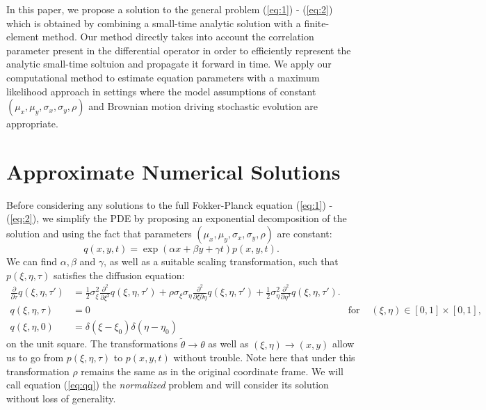 \documentclass[10pt]{article}
\begin{document}
In this paper, we propose a solution to the general problem
(\ref{eq:1}) - (\ref{eq:2}) which is obtained by combining a
small-time analytic solution with a finite-element method. Our method
directly takes into account the correlation parameter present in the
differential operator in order to efficiently represent the analytic
small-time soltuion and propagate it forward in time. We apply our
computational method to estimate equation parameters with a maximum
likelihood approach in settings where the model assumptions of
constant $(\mu_x, \mu_y, \sigma_x, \sigma_y, \rho)$ and Brownian
motion driving stochastic evolution are appropriate.


\section{Approximate Numerical Solutions}
Before considering any solutions to the full Fokker-Planck equation
(\ref{eq:1}) - (\ref{eq:2}), we simplify the PDE by proposing an
exponential decomposition of the solution and using the fact that parameters
$(\mu_x, \mu_y, \sigma_x, \sigma_y, \rho)$ are constant:
\[
  q(x,y,t) = \exp(\alpha x + \beta y + \gamma t) p(x,y,t).
\]
We can find $\alpha, \beta$ and $\gamma$, as well as a suitable
scaling transformation, such that $p(\xi,\eta,\tau)$ satisfies the diffusion
equation:
\begin{align}
  \frac{\partial}{\partial \tau} q(\xi,\eta,\tau') &= \frac{1}{2}\sigma_\xi^2
  \frac{\partial^2}{\partial \xi^2}q(\xi,\eta,\tau') + \rho\sigma_\xi\sigma_\eta
  \frac{\partial^2}{\partial \xi \partial \eta}q(\xi,\eta,\tau') +
  \frac{1}{2}\sigma_\eta^2 \frac{\partial^2}{\partial \eta^2}q(\xi,\eta,\tau').
                                          \label{eq:qq} \\
  q(\xi,\eta,\tau) &=0 &\mbox{for } & (\xi,\eta) \in [0,1] \times [0,1], \nonumber \\
  q(\xi,\eta,0) &= \delta(\xi-\xi_0) \delta(\eta-\eta_0) \nonumber
\end{align}
on the unit square.  The transformations $\tilde{\theta} \to \theta$
as well as $(\xi,\eta) \to (x,y)$ allow us to go from
$p(\xi,\eta,\tau)$ to $p(x,y,t)$ without trouble. Note here that under
this transformation $\rho$ remains the same as in the original
coordinate frame. We will call equation (\ref{eq:qq}) the
\textit{normalized} problem and will consider its solution without
loss of generality.
\end{document}
